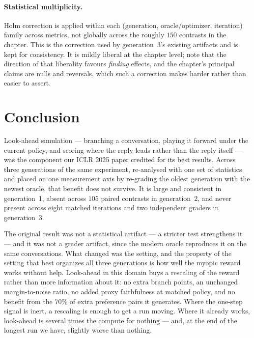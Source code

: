 \paragraph{Statistical multiplicity.}
Holm correction is applied within each (generation, oracle/optimizer, iteration) family across
metrics, not globally across the roughly $150$ contrasts in the chapter. This is the correction
used by generation~3's existing artifacts and is kept for consistency. It is mildly liberal at
the chapter level; note that the direction of that liberality favours \emph{finding} effects,
and the chapter's principal claims are nulls and reversals, which such a correction makes harder
rather than easier to assert.

\section{Conclusion}
\label{sec:conclusion}

Look-ahead simulation --- branching a conversation, playing it forward under the current policy,
and scoring where the reply leads rather than the reply itself --- was the component our ICLR
2025 paper credited for its best results. Across three generations of the same experiment,
re-analysed with one set of statistics and placed on one measurement axis by re-grading the
oldest generation with the newest oracle, that benefit does not survive. It is large and
consistent in generation~1, absent across $105$ paired contrasts in generation~2, and never
present across eight matched iterations and two independent graders in generation~3.

The original result was not a statistical artifact --- a stricter test strengthens it --- and it
was not a grader artifact, since the modern oracle reproduces it on the same conversations. What
changed was the setting, and the property of the setting that best organizes all three
generations is how well the myopic reward works without help. Look-ahead in this domain buys a
rescaling of the reward rather than more information about it: no extra branch points, an
unchanged margin-to-noise ratio, no added proxy faithfulness at matched policy, and no benefit
from the $70\%$ of extra preference pairs it generates. Where the one-step signal is inert, a
rescaling is enough to get a run moving. Where it already works, look-ahead is several times the
compute for nothing --- and, at the end of the longest run we have, slightly worse than nothing.
